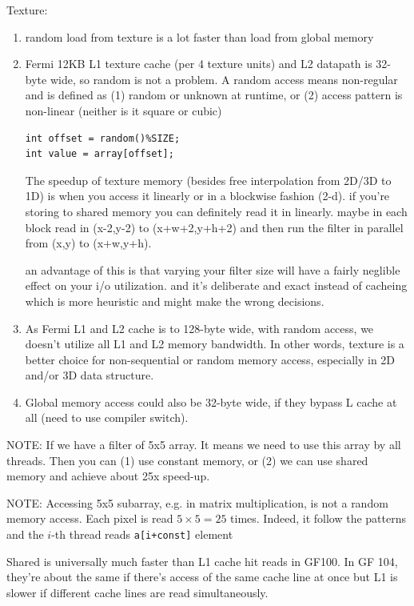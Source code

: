 Texture:
\begin{enumerate}
\item random load from texture is a lot faster than load from global
  memory 

\item Fermi 12KB L1 texture cache (per 4 texture units) and L2 datapath is
32-byte wide, so random is not a problem. A random access means non-regular and is
  defined as (1) random or unknown at runtime, or (2) access pattern
  is non-linear (neither is it square or cubic)
\begin{lstlisting}
int offset = random()%SIZE;
int value = array[offset];
\end{lstlisting}
  The speedup of texture memory (besides free interpolation from 2D/3D
  to 1D) is when you access it linearly or in a blockwise fashion
  (2-d). if you're storing to shared memory you can definitely read it
  in linearly. maybe in each block read in (x-2,y-2) to (x+w+2,y+h+2)
  and then run the filter in parallel from (x,y) to (x+w,y+h).

  an advantage of this is that varying your filter size will have a
  fairly neglible effect on your i/o utilization. and it's deliberate
  and exact instead of cacheing which is more heuristic and might make
  the wrong decisions.


\item As Fermi L1 and L2 cache is to 128-byte wide, with random
  access, we doesn't utilize all L1 and L2 memory bandwidth. In other
  words, texture is a better choice for non-sequential or random
  memory access, especially in 2D and/or 3D data structure.

\item Global memory access could also be 32-byte wide, if they bypass
  L cache at all (need to use compiler switch). 
\end{enumerate}

NOTE: If we have a filter of 5x5 array. It means we need to use this
array by all threads. Then you can (1) use constant memory, or (2) we
can use shared memory and achieve about 25x speed-up. 


NOTE: Accessing 5x5 subarray, e.g. in matrix multiplication, is not a
random memory access. Each pixel is read $5\times 5 = 25$ times.
Indeed, it follow the patterns and the $i$-th thread reads
\verb!a[i+const]!  element


Shared is universally much faster than L1 cache hit reads in GF100. In
GF 104, they're about the same if there's access of the same cache
line at once but L1 is slower if different cache lines are read
simultaneously.


